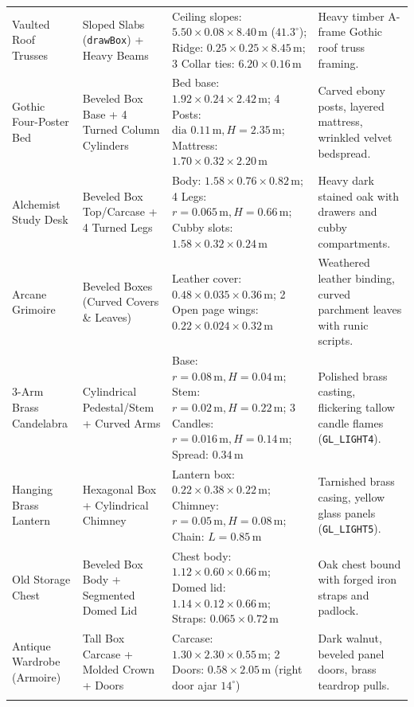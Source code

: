 \documentclass[10pt,a4paper,oneside]{article}
\begin{document}
\begin{longtable}{>{\raggedright\arraybackslash}p{}>{\raggedright\arraybackslash}p{}>{\raggedright\arraybackslash}p{}>{\raggedright\arraybackslash}p{}}
Vaulted Roof Trusses & Sloped Slabs (\texttt{drawBox}) + Heavy Beams & Ceiling slopes: $5.50\times 0.08\times 8.40\,\mathrm{m}$ ($41.3^\circ$); Ridge: $0.25\times 0.25\times 8.45\,\mathrm{m}$; 3 Collar ties: $6.20\times 0.16\,\mathrm{m}$ & Heavy timber A-frame Gothic roof truss framing.\\\addlinespace[3pt]

Gothic Four-Poster Bed & Beveled Box Base + 4 Turned Column Cylinders & Bed base: $1.92\times 0.24\times 2.42\,\mathrm{m}$; 4 Posts: $\text{dia } 0.11\,\mathrm{m}, H=2.35\,\mathrm{m}$; Mattress: $1.70\times 0.32\times 2.20\,\mathrm{m}$ & Carved ebony posts, layered mattress, wrinkled velvet bedspread.\\\addlinespace[3pt]

Alchemist Study Desk & Beveled Box Top/Carcase + 4 Turned Legs & Body: $1.58\times 0.76\times 0.82\,\mathrm{m}$; 4 Legs: $r=0.065\,\mathrm{m}, H=0.66\,\mathrm{m}$; Cubby slots: $1.58\times 0.32\times 0.24\,\mathrm{m}$ & Heavy dark stained oak with drawers and cubby compartments.\\\addlinespace[3pt]

Arcane Grimoire & Beveled Boxes (Curved Covers \& Leaves) & Leather cover: $0.48\times 0.035\times 0.36\,\mathrm{m}$; 2 Open page wings: $0.22\times 0.024\times 0.32\,\mathrm{m}$ & Weathered leather binding, curved parchment leaves with runic scripts.\\\addlinespace[3pt]

3-Arm Brass Candelabra & Cylindrical Pedestal/Stem + Curved Arms & Base: $r=0.08\,\mathrm{m}, H=0.04\,\mathrm{m}$; Stem: $r=0.02\,\mathrm{m}, H=0.22\,\mathrm{m}$; 3 Candles: $r=0.016\,\mathrm{m}, H=0.14\,\mathrm{m}$; Spread: $0.34\,\mathrm{m}$ & Polished brass casting, flickering tallow candle flames (\texttt{GL\_LIGHT4}).\\\addlinespace[3pt]

Hanging Brass Lantern & Hexagonal Box + Cylindrical Chimney & Lantern box: $0.22\times 0.38\times 0.22\,\mathrm{m}$; Chimney: $r=0.05\,\mathrm{m}, H=0.08\,\mathrm{m}$; Chain: $L=0.85\,\mathrm{m}$ & Tarnished brass casing, yellow glass panels (\texttt{GL\_LIGHT5}).\\\addlinespace[3pt]

Old Storage Chest & Beveled Box Body + Segmented Domed Lid & Chest body: $1.12\times 0.60\times 0.66\,\mathrm{m}$; Domed lid: $1.14\times 0.12\times 0.66\,\mathrm{m}$; Straps: $0.065\times 0.72\,\mathrm{m}$ & Oak chest bound with forged iron straps and padlock.\\\addlinespace[3pt]

Antique Wardrobe (Armoire) & Tall Box Carcase + Molded Crown + Doors & Carcase: $1.30\times 2.30\times 0.55\,\mathrm{m}$; 2 Doors: $0.58\times 2.05\,\mathrm{m}$ (right door ajar $14^\circ$) & Dark walnut, beveled panel doors, brass teardrop pulls.\\\addlinespace[3pt]

\bottomrule\end{longtable}
\end{document}
